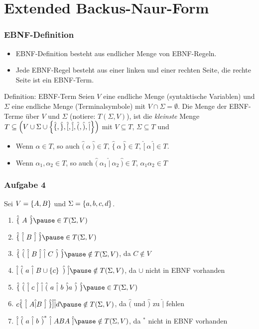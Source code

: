 \documentclass{beamer}
\newcommand{\wdh}[1]{\hat{\{} \ #1 \ \hat{\}}}
\newcommand{\opt}[2]{\hat{(} \ #1 \ \hat{|} \ #2 \ \hat{)}}
\newcommand{\byp}[1]{\hat{[} \ #1 \ \hat{]}}
\newcommand{\rdb}[1]{\hat{(} \ #1 \ \hat{)}}
\begin{document}
\section{Extended Backus-Naur-Form}

\begin{frame} \frametitle{EBNF-Definition}
	\small
	\begin{itemize}
		\item EBNF-Definition besteht aus endlicher Menge von EBNF-Regeln.
		\item Jede EBNF-Regel besteht aus einer linken und einer rechten Seite, die rechte Seite ist ein EBNF-Term.
	\end{itemize}
	\pause
	\begin{block}{Definition: EBNF-Term}
		Seien $V$ eine endliche Menge (syntaktische Variablen) und $\Sigma$ eine endliche Menge (Terminalsymbole) mit $V \cap \Sigma = \emptyset$. Die Menge der EBNF-Terme über $V$ und $\Sigma$ (notiere: $T(\Sigma, V)$), ist die \emph{kleinste} Menge $T \subseteq \left( V \cup \Sigma \cup \left\{ \hat{\{}, \hat{\}}, \hat{[}, \hat{]}, \hat{(}, \hat{)}, \hat{|} \right\} \right)$ mit $V \subseteq T$, $\Sigma \subseteq T$ und
		\begin{itemize}
			\item Wenn $\alpha \in T$, so auch $\rdb{\alpha} \in T$, $\wdh{\alpha} \in T$, $\byp{\alpha} \in T$.
			\item Wenn $\alpha_1, \alpha_2 \in T$, so auch $\opt{\alpha_1}{\alpha_2} \in T$, $\alpha_1 \alpha_2 \in T$
		\end{itemize}
	\end{block}
	
\end{frame}

\begin{frame} \frametitle{Aufgabe 4}
	\renewcommand{\theenumi}{\bfseries\alph{enumi}}
	
	Sei $V = \left\{ A,B \right\}$ und $\Sigma = \left\{ a,b,c,d \right\}$.
	
	\begin{enumerate}
		\item $\wdh{A} \pause \in T(\Sigma,V)$ \pause
		\item $\wdh{\byp{B}} \pause \in T(\Sigma,V)$ \pause
		\item $\wdh{\opt{\byp{B}}{C}} \pause \notin T(\Sigma,V)$, da $C \notin V$ \pause
		\item $\byp{\opt{a}{B \cup \menge{c}}} \pause \notin T(\Sigma,V)$, da $\cup$ nicht in EBNF vorhanden \pause
		\item $\wdh{\opt{\byp{c}}{\opt{a}{b} a}} \pause \in T(\Sigma,V)$ \pause
		\item $c \wdh{\byp{A \hat{|} B}} \hat{]} \hat{|} d \pause \notin T(\Sigma,V)$, da $\hat{(}$ und $\hat{)}$ zu $\hat{|}$ fehlen \pause
		\item $\byp{\opt{a}{b}^\ast \ \hat{|} \ ABA} \pause \notin T(\Sigma,V)$, da ${}^\ast$ nicht in EBNF vorhanden
	\end{enumerate}
\end{frame}
\end{document}
